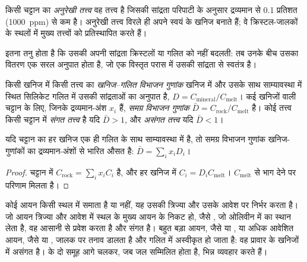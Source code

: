 \begin{definition}[अनुरेखी तत्त्व]\label{def:b2:elements-in-the-earth:trace}
किसी चट्टान का \emph{अनुरेखी तत्त्व} वह तत्त्व है जिसकी
सांद्रता परिपाटी के अनुसार द्रव्यमान से 0.1 प्रतिशत (\qty{1000}{ppm}) से कम है।
अनुरेखी तत्त्व विरले ही अपने स्वयं के खनिज बनाते हैं; वे क्रिस्टल-जालकों के स्थलों में मुख्य
तत्त्वों को प्रतिस्थापित करते हैं।
\end{definition}

 इतना तनु होता है कि उसकी अपनी सांद्रता क्रिस्टलों या
गलित को नहीं बदलती: तब उनके बीच उसका वितरण एक सरल अनुपात होता है,
जो एक विस्तृत परास में उसकी सांद्रता से स्वतंत्र है।

\begin{definition}[खनिज--गलित विभाजन गुणांक; संगत और
असंगत तत्त्व]\label{def:b2:elements-in-the-earth:partition}
किसी खनिज में किसी तत्त्व का \emph{खनिज--गलित विभाजन गुणांक}
खनिज में और उसके साथ साम्यावस्था में स्थित सिलिकेट गलित में उसकी सांद्रताओं का
अनुपात है,
$D = C_{\mathrm{mineral}}/C_{\mathrm{melt}}$। कई खनिजों वाली चट्टान के लिए, जिनके
द्रव्यमान-अंश $x_i$ हैं, \emph{समग्र विभाजन गुणांक}
$\bar D = C_{\mathrm{rock}}/C_{\mathrm{melt}}$ है। कोई तत्त्व किसी चट्टान में
\emph{संगत तत्त्व} है यदि $\bar D > 1$,
और \emph{असंगत तत्त्व} यदि $\bar D < 1$।
\end{definition}

\begin{proposition}[समग्र विभाजन गुणांक]
\label{prop:b2:elements-in-the-earth:bulk-d}
यदि चट्टान का हर खनिज एक ही गलित के साथ साम्यावस्था में है, तो समग्र
विभाजन गुणांक खनिज-गुणांकों का द्रव्यमान-अंशों से भारित
औसत है: $\bar D = \sum_i x_i D_i$।
\end{proposition}

\begin{proof}
चट्टान में $C_{\mathrm{rock}} = \sum_i x_i C_i$ है, और हर खनिज में
$C_i = D_i C_{\mathrm{melt}}$। $C_{\mathrm{melt}}$ से भाग देने पर परिणाम मिलता है।
\end{proof}

कोई आयन किसी स्थल में समाता है या नहीं, यह उसकी त्रिज्या और उसके आवेश पर निर्भर करता है। जो आयन
त्रिज्या और आवेश में स्थल के मुख्य आयन के निकट हो, जैसे , जो ओलिवीन में
 का स्थान लेता है, वह आसानी से प्रवेश करता है और संगत है। बहुत बड़ा आयन, जैसे
 या , या अधिक आवेशित आयन, जैसे  या
, जालक पर तनाव डालता है और गलित में अस्वीकृत हो जाता है: वह
प्रावार के खनिजों में असंगत है।  के दो समूह
आगे चलकर, जब जल सम्मिलित होता है, भिन्न व्यवहार करते हैं।

